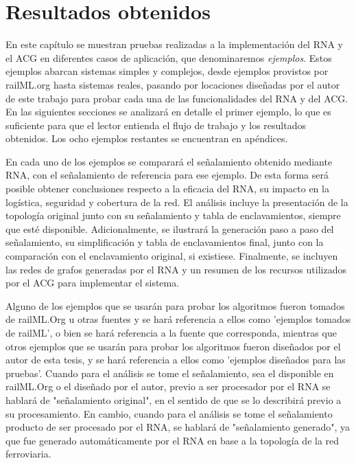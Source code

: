 \chapter{Resultados obtenidos}
	\label{sec:resultados}

	En este capítulo se muestran pruebas realizadas a la implementación del RNA y el ACG en diferentes casos de aplicación, que denominaremos \textit{ejemplos}. Estos ejemplos abarcan sistemas simples y complejos, desde ejemplos provistos por railML.org hasta sistemas reales, pasando por locaciones diseñadas por el autor de este trabajo para probar cada una de las funcionalidades del RNA y del ACG. En las siguientes secciones se analizará en detalle el primer ejemplo, lo que es suficiente para que el lector entienda el flujo de trabajo y los resultados obtenidos. Los ocho ejemplos restantes se encuentran en apéndices.
	
	En cada uno de los ejemplos se comparará el señalamiento obtenido mediante RNA, con el señalamiento de referencia para ese ejemplo. De esta forma será posible obtener conclusiones respecto a la eficacia del RNA, su impacto en la logística, seguridad y cobertura de la red. El análisis incluye la presentación de la topología original junto con su señalamiento y tabla de enclavamientos, siempre que esté disponible. Adicionalmente, se ilustrará la generación paso a paso del señalamiento, su simplificación y tabla de enclavamientos final, junto con la comparación con el enclavamiento original, si existiese. Finalmente, se incluyen las redes de grafos generadas por el RNA y un resumen de los recursos utilizados por el ACG para implementar el sistema.
	
	Alguno de los ejemplos que se usarán para probar los algoritmos fueron tomados de railML.Org u otras fuentes y se hará referencia a ellos como 'ejemplos tomados de railML', o bien se hará referencia a la fuente que corresponda, mientras que otros ejemplos que se usarán para probar los algoritmos fueron diseñados por el autor de esta tesis, y se hará referencia a ellos como 'ejemplos diseñados para las pruebas'. Cuando para el análisis se tome el señalamiento, sea el disponible en railML.Org o el diseñado por el autor, previo a ser procesador por el RNA se hablará de "señalamiento original", en el sentido de que se lo describirá previo a su procesamiento. En cambio, cuando para el análisis se tome el señalamiento producto de ser procesado por el RNA, se hablará de "señalamiento generado", ya que fue generado automáticamente por el RNA en base a la topología de la red ferroviaria.	
	
	
	
	
